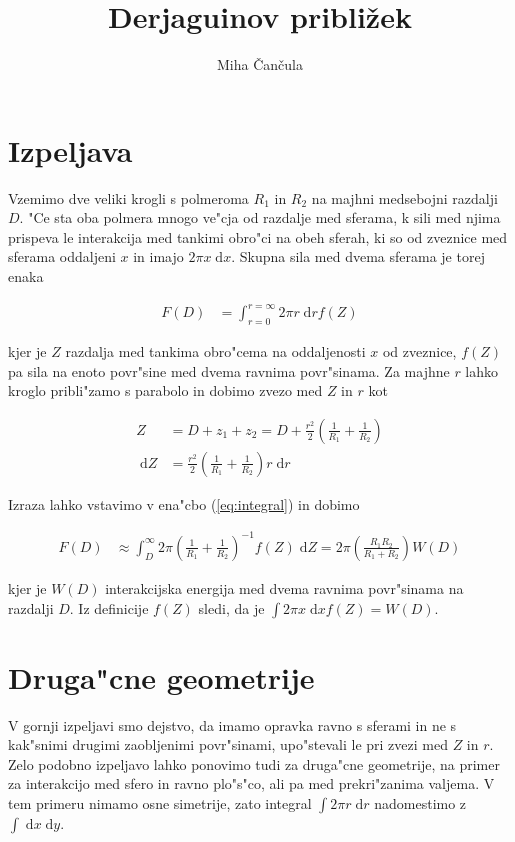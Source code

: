 \documentclass[a4paper,10pt]{article}
\title{Derjaguinov pribli\v zek}
\author{Miha \v Can\v cula}
\newcommand{\dd}{\;\mathrm{d}}
\begin{document}
\maketitle

\section{Izpeljava}

Vzemimo dve veliki krogli s polmeroma $R_1$ in $R_2$ na majhni medsebojni razdalji $D$. 
"Ce sta oba polmera mnogo ve"cja od razdalje med sferama, k sili med njima prispeva le interakcija med tankimi obro"ci na obeh sferah, ki so od zveznice med sferama oddaljeni $x$ in imajo $2\pi x \dd x$. 
Skupna sila med dvema sferama je torej enaka

\begin{align}
\label{eq:integral}
 F(D) &= \int_{r=0}^{r=\infty} 2\pi r \dd r f(Z)
\end{align}

kjer je $Z$ razdalja med tankima obro"cema na oddaljenosti $x$ od zveznice, $f(Z)$ pa sila na enoto povr"sine med dvema ravnima povr"sinama. 
Za majhne $r$ lahko kroglo pribli"zamo s parabolo in dobimo zvezo med $Z$ in $r$ kot

\begin{align}
 Z &= D + z_1 + z_2 = D + \frac{r^2}{2} \left(\frac{1}{R_1} + \frac{1}{R_2}\right) \\
 \dd Z &= \frac{r^2}{2} \left(\frac{1}{R_1} + \frac{1}{R_2}\right)r \dd r
\end{align}

Izraza lahko vstavimo v ena"cbo (\ref{eq:integral}) in dobimo

\begin{align}
 F(D) &\approx \int_D^\infty 2\pi \left(\frac{1}{R_1} + \frac{1}{R_2}\right)^{-1}f(Z) \dd Z = 2\pi \left(\frac{R_1R_2}{R_1 + R_2}\right) W(D)
\end{align}

kjer je $W(D)$ interakcijska energija med dvema ravnima povr"sinama na razdalji $D$. Iz definicije $f(Z)$ sledi, da je $\int 2\pi x \dd x f(Z) = W(D)$. 

\section{Druga"cne geometrije}

V gornji izpeljavi smo dejstvo, da imamo opravka ravno s sferami in ne s kak"snimi drugimi zaobljenimi povr"sinami, upo"stevali le pri zvezi med $Z$ in $r$. 
Zelo podobno izpeljavo lahko ponovimo tudi za druga"cne geometrije, na primer za interakcijo med sfero in ravno plo"s"co, ali pa med prekri"zanima valjema. 
V tem primeru nimamo osne simetrije, zato integral $\int 2\pi r \dd r$ nadomestimo z $\int \dd x \dd y$. 
\end{document}

